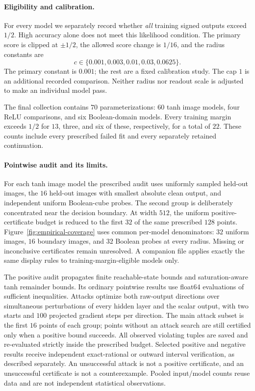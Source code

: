 \paragraph{Eligibility and calibration.}
For every model we separately record whether \emph{all} training signed
outputs exceed $1/2$. High accuracy alone does not meet this likelihood
condition. The primary score is clipped at $\pm1/2$, the allowed score
change is $1/16$, and the radius constants are
\[
 c\in\{0.001,0.003,0.01,0.03,0.0625\}.
\]
The primary constant is $0.001$; the rest are a fixed calibration study.
The cap $1$ is an additional recorded comparison. Neither radius nor
readout scale is adjusted to make an individual model pass.


The final collection contains $70$ parameterizations: $60$ tanh image
models, four ReLU comparisons, and six Boolean-domain models.
Every training margin exceeds $1/2$ for $13$, three, and six of these,
respectively, for a total of $22$. These counts include every prescribed
failed fit and every separately retained continuation.

\paragraph{Pointwise audit and its limits.}
For each tanh image model the prescribed audit uses uniformly sampled held-out
images, the $16$ held-out images with smallest absolute clean output,
and independent uniform Boolean-cube probes. The second group is
deliberately concentrated near the decision boundary. At width $512$,
the uniform positive-certificate budget is reduced to the first $32$
of the same prescribed $128$ points. Figure~\ref{fig:empirical-coverage}
uses common per-model denominators: $32$ uniform images, $16$ boundary
images, and $32$ Boolean probes at every radius. Missing or inconclusive
certificates remain unresolved. A companion file applies exactly the
same display rules to training-margin-eligible models only.

The positive audit propagates finite reachable-state bounds and
saturation-aware tanh remainder bounds. Its ordinary pointwise results
use float64 evaluations of sufficient inequalities. Attacks optimize
both raw-output directions over simultaneous perturbations of every
hidden layer and the scalar output, with two starts and $100$ projected
gradient steps per direction. The main attack subset is the first $16$
points of each group; points without an attack search are still certified
only when a positive bound succeeds. All observed violating tuples are saved
and re-evaluated strictly inside the prescribed budget. Selected positive
and negative results receive independent exact-rational or outward
interval verification, as described separately. An unsuccessful attack
is not a positive certificate, and an unsuccessful certificate is not
a counterexample. Pooled input/model counts reuse data and are not
independent statistical observations.

